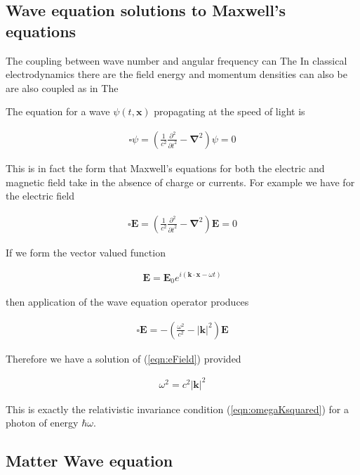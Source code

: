 \documentclass[]{eliblog}
\newcommand{\Abs}[1]{{\left\lvert{#1}\right\rvert}}
\newcommand{\BE}[0]{\mathbf{E}}
\newcommand{\Bk}[0]{\mathbf{k}}
\newcommand{\Bx}[0]{\mathbf{x}}
\newcommand{\spacegrad}[0]{\boldsymbol{\nabla}}
\newcommand{\delambertian}[0]{\square}
\begin{document}
\subsection{Wave equation solutions to Maxwell's equations}

The coupling between wave number and angular frequency can 
The 
In classical electrodynamics there are the field energy and momentum densities can also be are also coupled as in 
The 

The equation for a wave $\psi(t,\Bx)$ propagating at the speed of light is

\begin{align}
\delambertian \psi = \left( \frac{1}{c^2}\frac{\partial^2}{{\partial t}^2} - \spacegrad^2 \right) \psi = 0
\end{align}

This is in fact the form that Maxwell's equations for both the electric and magnetic field take in the absence of charge or currents.
For example we have for the electric field

\begin{align}\label{eqn:eField}
\delambertian \BE = \left( \frac{1}{c^2}\frac{\partial^2}{{\partial t}^2} - \spacegrad^2 \right) \BE = 0
\end{align}

If we form the vector valued function

\begin{align}\label{eqn:testSolutionE}
\BE = \BE_0 e^{ i( \Bk \cdot \Bx - \omega t ) }
\end{align}

then application of the wave equation operator produces

\begin{align}\label{eqn:boxApplied}
\delambertian \BE = -\left( \frac{\omega^2}{c^2} - \Abs{\Bk}^2 \right) \BE
\end{align}

Therefore we have a solution of (\ref{eqn:eField}) provided

\begin{align}
\omega^2 = c^2 \Abs{\Bk}^2
\end{align}

This is exactly the relativistic invariance condition (\ref{eqn:omegaKsquared}) for a photon of energy $\hbar \omega$.

\subsection{Matter Wave equation}
\end{document}
